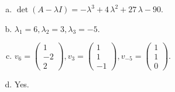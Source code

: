 \begin{questions}
\begin{solution}
\begin{enumerate}[(a)]
\item $\det(A-\lambda I)=-{\lambda}^{3} + 4 \, {\lambda}^{2} + 27 \, {\lambda} - 90$.
\item ${\lambda}_1=6, {\lambda}_2=3, {\lambda}_3=-5$.
\item $v_{6}=\left(\begin{array}{r}
1 \\
-2 \\
2
\end{array}\right), v_{3}=\left(\begin{array}{r}
1 \\
1 \\
-1
\end{array}\right), v_{-5}=\left(\begin{array}{r}
1 \\
1 \\
0
\end{array}\right)$.
\item Yes.
\end{enumerate}
\end{solution}

\end{questions}

\newpage


\begin{center}
\end{center}

